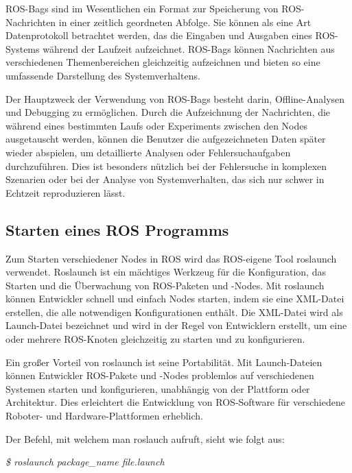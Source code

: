 \begin{description}
    ROS-Bags sind im Wesentlichen ein Format zur Speicherung von \ac{ROS}-Nachrichten in einer zeitlich geordneten Abfolge. Sie können als eine Art Datenprotokoll betrachtet werden, das die Eingaben und Ausgaben eines \ac{ROS}-Systems während der Laufzeit aufzeichnet. ROS-Bags können Nachrichten aus verschiedenen Themenbereichen gleichzeitig aufzeichnen und bieten so eine umfassende Darstellung des Systemverhaltens.
    
    Der Hauptzweck der Verwendung von ROS-Bags besteht darin, Offline-Analysen und Debugging zu ermöglichen. Durch die Aufzeichnung der Nachrichten, die während eines bestimmten Laufs oder Experiments zwischen den Nodes ausgetauscht werden, können die Benutzer die aufgezeichneten Daten später wieder abspielen, um detaillierte Analysen oder Fehlersuchaufgaben durchzuführen. Dies ist besonders nützlich bei der Fehlersuche in komplexen Szenarien oder bei der Analyse von Systemverhalten, das sich nur schwer in Echtzeit reproduzieren lässt.

    \cite[vgl.][]{ros-bags}
\end{description}

\subsection{Starten eines ROS Programms} \label{starten eines ROS Programms:subsection}
    Zum Starten verschiedener Nodes in \ac{ROS} wird das ROS-eigene Tool roslaunch verwendet. Roslaunch ist ein mächtiges Werkzeug für die Konfiguration, das Starten und die Überwachung von ROS-Paketen und -Nodes. Mit roslaunch können Entwickler schnell und einfach Nodes starten, indem sie eine XML-Datei erstellen, die alle notwendigen Konfigurationen enthält. Die XML-Datei wird als Launch-Datei bezeichnet und wird in der Regel von Entwicklern erstellt, um eine oder mehrere ROS-Knoten gleichzeitig zu starten und zu konfigurieren.

    Ein großer Vorteil von roslaunch ist seine Portabilität. Mit Launch-Dateien können Entwickler ROS-Pakete und -Nodes problemlos auf verschiedenen Systemen starten und konfigurieren, unabhängig von der Plattform oder Architektur. Dies erleichtert die Entwicklung von ROS-Software für verschiedene Roboter- und Hardware-Plattformen erheblich. \cite{roslaunch}

    Der Befehl, mit welchem man roslauch aufruft, sieht wie folgt aus:
    
    \textit{\$ roslaunch package\_name file.launch}

